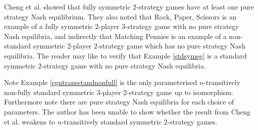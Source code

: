 Cheng et al. \cite{CRVWSym} showed that fully symmetric $2$-strategy games have at least one pure strategy Nash equilibrium. They also noted that Rock, Paper, Scissors is an example of a fully symmetric $2$-player $3$-strategy game with no pure strategy Nash equilibria, and indirectly that Matching Pennies is an example of a non-standard symmetric $2$-player $2$-strategy game which has no pure strategy Nash equilibria. The reader may like to verify that Example \ref{stdsymeg} is a standard symmetric $2$-strategy game with no pure strategy Nash equilibria. 

Note Example \ref{egntransstandnonfull} is the only parameterised $n$-transitively non-fully standard symmetric $3$-player $2$-strategy game up to isomorphism. Furthermore note there are pure strategy Nash equilibria for each choice of parameters. The author has been unable to show whether the result from Cheng et al. \cite{CRVWSym} weakens to $n$-transitively standard symmetric $2$-strategy games.

